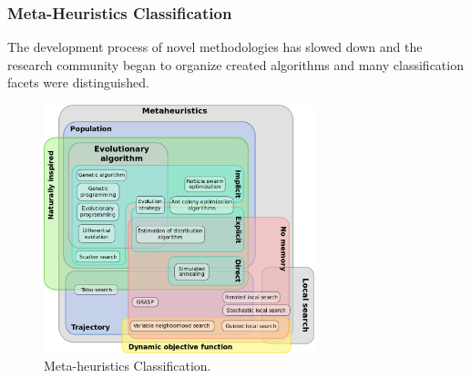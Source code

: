\subsubsection{Meta-Heuristics Classification}
The development process of novel methodologies has slowed down and the research community began to organize created algorithms and many classification facets were distinguished.

\begin{figure}
	\centering
	\includegraphics[width=0.7\textwidth]{graphics/Background/Metaheuristics_classification}
	\caption{Meta-heuristics Classification.}
	\label{BG: MH classification}
\end{figure}

